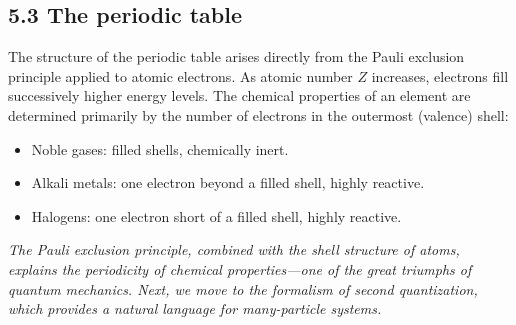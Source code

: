 \documentclass[12pt,a4paper]{article}
\begin{document}
\subsection{5.3 The periodic table}

The structure of the periodic table arises directly from the Pauli exclusion principle applied to atomic electrons.  As atomic number $Z$ increases, electrons fill successively higher energy levels.  The chemical properties of an element are determined primarily by the number of electrons in the outermost (valence) shell:
\begin{itemize}[nosep]
    \item Noble gases: filled shells, chemically inert.
    \item Alkali metals: one electron beyond a filled shell, highly reactive.
    \item Halogens: one electron short of a filled shell, highly reactive.
\end{itemize}

\medskip
\noindent\textit{The Pauli exclusion principle, combined with the shell structure of atoms, explains the periodicity of chemical properties---one of the great triumphs of quantum mechanics.  Next, we move to the formalism of second quantization, which provides a natural language for many-particle systems.}
\end{document}
